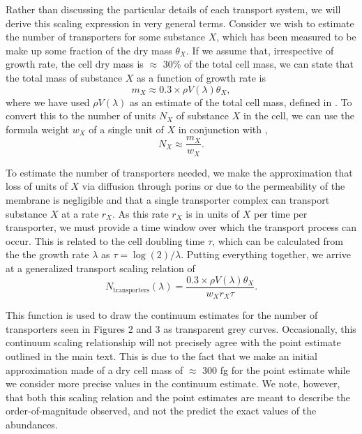 Rather than discussing the particular details of each transport system, we will
derive this scaling expression in very general terms. Consider we wish to
estimate the number of transporters for some substance $X$, which has been
measured to be make up some fraction of the dry mass $\theta_X$. If we assume
that, irrespective of growth rate, the cell dry mass is $\approx$ 30\% of the
total cell mass, we can state that the total mass of substance $X$ as a function
of growth rate is 
\begin{equation}
m_X \approx 0.3 \times \rho V(\lambda) \theta_X,
\label{eq:m_x}
\end{equation}
where we have used $\rho V(\lambda)$ as an estimate of the total cell mass,
defined in . To convert this to the number of units $N_X$ of substance
$X$ in the cell, we can use the formula weight $w_X$ of a single unit of $X$ in
conjunction with ,
\begin{equation}
    N_X \approx \frac{m_X}{w_X}.
    \label{eq:n_x}
\end{equation}

To estimate the number of transporters needed, we make the approximation that
loss of units of $X$ via diffusion through porins or due to the permeability of
the membrane is negligible  and that a single transporter complex can transport
substance $X$ at a rate $r_X$. As this rate $r_X$  is in units of $X$ per time
per transporter, we must provide a time window over which the transport process
can occur. This is related to the cell doubling time $\tau$, which can be
calculated from the the growth rate $\lambda$ as $\tau = \log(2) / \lambda$.
Putting everything together, we arrive at a generalized transport scaling
relation of 
\begin{equation}
N_\text{transporters}(\lambda) = \frac{0.3 \times \rho V(\lambda)\theta_X}{w_X r_X \tau}.
\label{eq:transporter_continuum}
\end{equation}

This function is used to draw the continuum estimates for the number of
transporters seen in Figures 2 and 3 as transparent grey curves. Occasionally,
this continuum scaling relationship will not precisely agree with the point
estimate outlined in the main text. This is due to the fact that we make  an
initial approximation made of a dry cell mass of $\approx$ 300 fg for the point
estimate while we consider more precise values in the continuum estimate. We
note, however, that both this scaling relation and the point estimates are meant
to describe the order-of-magnitude observed, and not the predict the exact
values of the abundances. 

